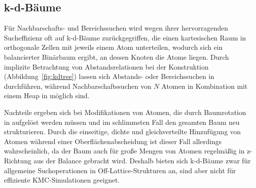 
\subsection{k-d-Bäume}
\label{datakdtree}

Für Nachbarschafts- und Bereichssuchen wird wegen ihrer hervorragenden Sucheffizienz oft auf k-d-Bäume zurückgegriffen, die einen kartesischen Raum in orthogonale Zellen mit jeweils einem Atom unterteilen, wodurch sich ein balancierter Binärbaum ergibt, an dessen Knoten die Atome liegen.
Durch implizite Betrachtung von Abstandsrelationen bei der Konstruktion (Abbildung~\ref{fig:kdtree}) lassen sich Abstands- oder Bereichssuchen in  durchführen, während Nachbarschaftssuchen von $N$ Atomen in Kombination mit einem Heap in  möglich sind.

Nachteile ergeben sich bei Modifikationen von Atomen, die durch Baumrotation in  aufgelöst werden müssen und im schlimmsten Fall den gesamten Baum neu strukturieren.
Durch die einseitige, dichte und gleichverteilte Hinzufügung von Atomen während einer Oberflächenabscheidung ist dieser Fall allerdings wahrscheinlich, da der Baum auch für große Mengen von Atomen regelmäßig in z-Richtung aus der Balance gebracht wird.
Deshalb bieten sich k-d-Bäume zwar für allgemeine Suchoperationen in Off-Lattice-Strukturen an, sind aber nicht für effiziente KMC-Simulationen geeignet.

